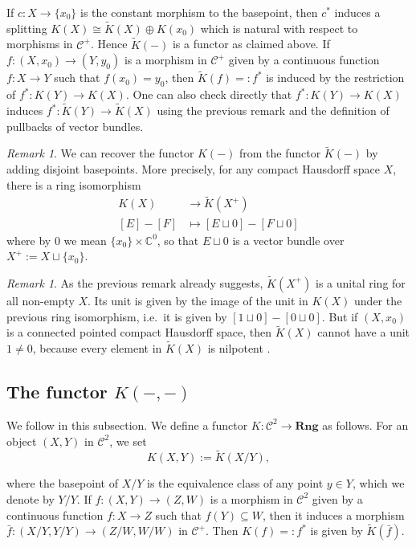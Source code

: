 \documentclass[12pt,a4paper]{amsart}
\theoremstyle{plain}
\theoremstyle{definition}
\theoremstyle{remark}
\newtheorem{rem}[thm]{Remark}
\begin{document}
If $c \colon X \to \{ x_{0} \}$ is the constant morphism to the basepoint, then $c^{*}$ induces a splitting $K(X) \cong \tilde{K}(X) \oplus K(x_{0})$ which is natural with respect to morphisms in $\mathcal{C}^{+}$.
Hence $\tilde{K}(-)$ is a functor as claimed above.
If $f \colon (X,x_{0}) \to (Y,y_{0})$ is a morphism in $\mathcal{C}^{+}$ given by a continuous function $f \colon X \to Y$ such that $f(x_{0}) = y_{0}$, then $\tilde{K}(f) =: f^{*}$ is induced by the restriction of $f^{*} \colon K(Y) \to K(X)$.
One can also check directly that $f^{*} \colon K(Y) \to K(X)$ induces $f^{*} \colon \tilde{K}(Y) \to \tilde{K}(X)$ using the previous remark and the definition of pullbacks of vector bundles.

\begin{rem}
  We can recover the functor $K(-)$ from the functor $\tilde{K}(-)$ by adding disjoint basepoints.
  More precisely, for any compact Hausdorff space $X$, there is a ring isomorphism
  \begin{align*} 
    K(X) & \to \tilde{K}(X^{+}) \\
    [E] - [F] & \mapsto [E \sqcup 0] - [F \sqcup 0]
  \end{align*}
  where by $0$ we mean $\{ x_{0} \} \times \mathbb{C}^{0}$, so that $E \sqcup 0$ is a vector bundle over $X^{+} := X \sqcup \{ x_{0} \}$.
\end{rem}

\begin{rem}
  As the previous remark already suggests, $\tilde{K}(X^{+})$ is a unital ring for all non-empty $X$.
  Its unit is given by the image of the unit in $K(X)$ under the previous ring isomorphism, i.e.~it is given by $[1 \sqcup 0] - [0 \sqcup 0]$.
  But if $(X, x_{0})$ is a connected pointed compact Hausdorff space, then $\tilde{K}(X)$ cannot have a unit $1 \neq 0$, because every element in $\tilde{K}(X)$ is nilpotent \cite[Theorem II.5.9]{kar78}.
\end{rem}

\subsection{The functor $K(-,-)$}
We follow \cite[p.~66]{ati67} in this subsection.
We define a functor $K \colon \mathcal{C}^{2} \to \mathbf{Rng}$ as follows.
For an object $(X,Y)$ in $\mathcal{C}^{2}$, we set
\[ K(X,Y) := \tilde{K}(X/Y), \]

where the basepoint of $X/Y$ is the equivalence class of any point $y \in Y$, which we denote by $Y/Y$.
If $f \colon (X,Y) \to (Z,W)$ is a morphism in $\mathcal{C}^{2}$ given by a continuous function $f \colon X \to Z$ such that $f(Y) \subseteq W$, then it induces a morphism $\bar{f} \colon (X/Y,Y/Y) \to (Z/W, W/W)$ in $\mathcal{C}^{+}$.
Then $K(f) =: f^{*}$ is given by $\tilde{K}(\bar{f})$.
\end{document}
